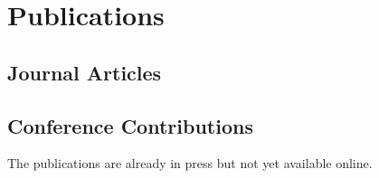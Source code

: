 \documentclass[11pt]{article}
\begin{document}


\section{Publications}


\nocite{kleiner.2017,kleiner.2017a,kleiner.2021,kleiner.2021a,kleiner.2021b,kleiner.2021c,kleiner.2021d,kleiner.2021e,kleiner.2021f,kleiner.2021g,kleiner.2021h,kleiner.2022,kleiner.2022a,kleiner.2022b,kleiner.2024,kleiner.2024a,kleiner.2025b,kleiner.2025c,kleiner.2025d,kleiner.2025f,kleiner.2026,kleiner.2026a,kleiner.2026b,kleiner.2026c,kleiner.2026d,kleiner.2026e,kleiner.2026f,kleiner.2026g,kleiner.2026h,kleiner.2026i,kleiner.2026j} %
\nocite{vogt.2018,schirmer.2019,naber.2020,jiang.2022,nguyen-tuan.2023,rossler.2023,rossler.2023a,nguyen-tuan.2024,nguyentuan.2024,li.2025,frolov.2025,shittu.2026,li.2026,li.2026a,shittu.2026a,nguyen-tuan.2026a,babazadehshareh.2026}%

\subsection{Journal Articles} \medskip
\newrefcontext[sorting=ynt]
\printbibliography[heading=none,keyword=myPapers]

\subsection{Conference Contributions} \medskip
\newrefcontext[labelprefix={K},sorting=ynt]
\printbibliography[heading=none,keyword=myConferencePapers]
\small
The publications \cite{babazadehshareh.2026, shittu.2026a, li.2026a,nguyen-tuan.2026a,kleiner.2026g} are already in press but not yet available online.
\end{document}
